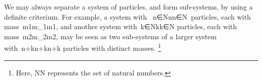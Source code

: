 We may always separate a system of particles, and form sub-systems, by using a definite criterium. For example, a system with  n∈Nn\in{}n∈N​ particles, each with mass m1m_1m1​​, and another system with k∈Nk\in{}k∈N​ particles, each with mass m2m_2m2​​, may be seen as two sub-systems of a larger system with n+kn+kn+k​ particles with distinct masses. \footnote{Here, NN​ represents the set of natural numbers.}